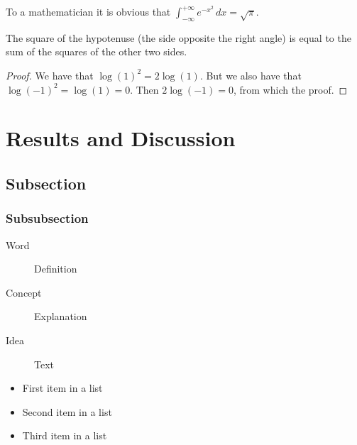 \documentclass[
10pt, %
a4paper, %
oneside, %
headinclude,footinclude, %
BCOR5mm, %
]{scrartcl}
\begin{document}
\lipsum[5] %

\begin{definition}[Gauss] 
To a mathematician it is obvious that
$\int_{-\infty}^{+\infty}
e^{-x^2}\,dx=\sqrt{\pi}$. 
\end{definition} 

\begin{theorem}[Pythagoras]
The square of the hypotenuse (the side opposite the right angle) is equal to the sum of the squares of the other two sides.
\end{theorem}

\begin{proof} 
We have that $\log(1)^2 = 2\log(1)$.
But we also have that $\log(-1)^2=\log(1)=0$.
Then $2\log(-1)=0$, from which the proof.
\end{proof}


\section{Results and Discussion}

\lipsum[10] %


\subsection{Subsection}

\lipsum[11] %

\subsubsection{Subsubsection}

\lipsum[12] %

\begin{description}
\item[Word] Definition
\item[Concept] Explanation
\item[Idea] Text
\end{description}

\lipsum[12] %

\begin{itemize}[noitemsep] %
\item First item in a list
\item Second item in a list
\item Third item in a list
\end{itemize}
\end{document}
